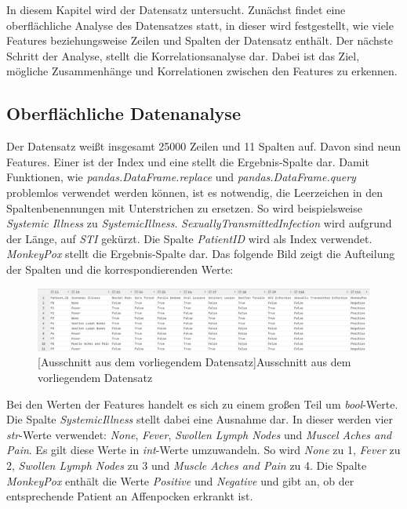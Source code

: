 \documentclass[13pt,a4paper, listof=entryprefix, bibliography=totocnumbered,toc=listofnumbered,lof=listofnumbered]{scrartcl}
\begin{document}
In diesem Kapitel wird der Datensatz untersucht. Zunächst findet eine oberflächliche Analyse des Datensatzes statt, in dieser
wird festgestellt, wie viele Features beziehungsweise Zeilen und Spalten der Datensatz enthält. Der nächste Schritt der Analyse, stellt die Korrelationsanalyse
dar. Dabei ist das Ziel, mögliche Zusammenhänge und Korrelationen zwischen den Features zu erkennen. 

	\subsection{Oberflächliche Datenanalyse}
		\label{ch:oberflaechliche_analyse}

Der Datensatz weißt insgesamt 25000 Zeilen und 11 Spalten auf. Davon sind 
neun Features. Einer ist der Index und eine stellt die Ergebnis-Spalte dar. Damit Funktionen, wie \textit{pandas.DataFrame.replace} und 
\textit{pandas.DataFrame.query} problemlos verwendet werden können, ist es notwendig, die Leerzeichen in den Spaltenbenennungen mit Unterstrichen zu ersetzen. 
So wird beispielsweise \textit{Systemic Illness} zu \textit{Systemic\textunderscore Illness}. \textit{Sexually\textunderscore Transmitted\textunderscore Infection} wird aufgrund der Länge, auf
\textit{STI} gekürzt. Die Spalte \textit{Patient\textunderscore ID} wird als Index verwendet. 
\textit{MonkeyPox} stellt die Ergebnis-Spalte dar. Das folgende Bild zeigt die Aufteilung der Spalten und die korrespondierenden Werte:

	\begin{figure}[H]
		\centering
		\includegraphics[width=0.8\linewidth]{Bilder/data_table.png}
		[Ausschnitt aus dem vorliegendem Datensatz]{Ausschnitt aus dem vorliegendem Datensatz}
		\label{fig:data_table}
	\end{figure}

Bei den Werten der Features handelt es sich zu einem großen Teil um \textit{bool}-Werte. Die Spalte \textit{Systemic\textunderscore Illness} stellt dabei eine Ausnahme dar. In dieser werden
vier \textit{str}-Werte verwendet: \textit{None}, \textit{Fever}, \textit{Swollen Lymph Nodes} und \textit{Muscel Aches and Pain}. Es gilt diese Werte in \textit{int}-Werte umzuwandeln. So wird \textit{None} zu 1,
\textit{Fever} zu 2, \textit{Swollen Lymph Nodes} zu 3 und \textit{Muscle Aches and Pain} zu 4. Die Spalte \textit{MonkeyPox} enthält die Werte \textit{Positive} und \textit{Negative} und gibt
an, ob der entsprechende Patient an Affenpocken erkrankt ist.
\end{document}
